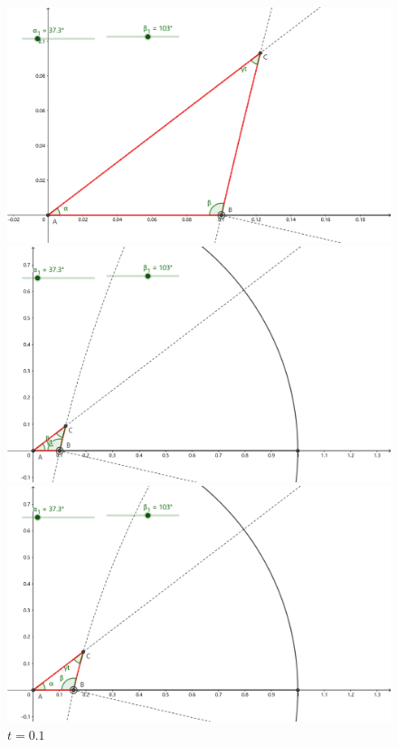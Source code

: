 \documentclass{article}
\begin{document}
\begin{figure}[htbp]%
    \centering
    \begin{minipage}{0.25\linewidth}
        \centering
        \includegraphics[width={0.9\linewidth}]{B6.png}
        \caption*{$t=0.1$}
    \end{minipage}
    \begin{minipage}{0.25\linewidth}
        \centering
        \includegraphics[width={0.9\linewidth}]{B5.png}
        \caption*{$t=0.1$}
    \end{minipage}
    \begin{minipage}{0.25\linewidth}
        \centering
        \includegraphics[width={0.9\linewidth}]{B4.png}

\end{minipage}
\end{figure}
\end{document}
